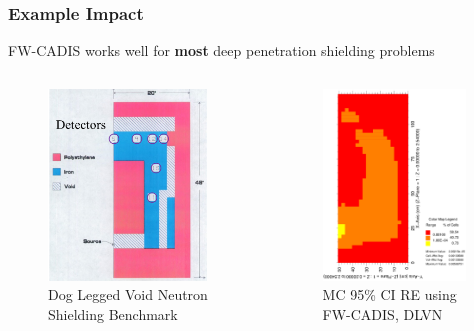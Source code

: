 \documentclass[xcolor=x11names,compress]{beamer}
\renewcommand{\(}{\begin{columns}}
\renewcommand{\)}{\end{columns}}
\newcommand{\<}[1]{\begin{column}{#1}}
\renewcommand{\>}{\end{column}}
\begin{document}
\begin{frame}[fragile]
  \frametitle{Example Impact}

	FW-CADIS works well for \textbf{most} deep penetration
	shielding problems
	\begin{columns}
  	\begin{column}{0.5\textwidth}
  	\begin{figure}
  	\begin{center}
  		\includegraphics[height=2in,clip]{dlvn}
		\caption{Dog Legged Void Neutron Shielding Benchmark}
	\end{center}
  	\end{figure}
  	\end{column}
 	\begin{column}{0.5\textwidth}
 	\begin{figure}
  	\begin{center}
  		\includegraphics[height=2in,clip]{dlvn-lowVR}
  		\caption{MC 95\% CI RE using FW-CADIS, DLVN}
  	\end{center}
  	\end{figure}
  	\end{column}
	\end{columns}
  
\end{frame}
\end{document}
